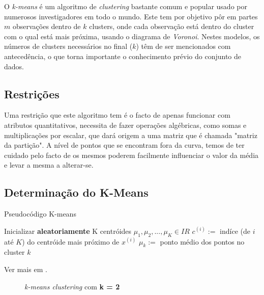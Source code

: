 \documentclass[12pt, a4paper, oneside]{scrreport}
\begin{document}
\quad O \textit{k-means} é um algoritmo de \textit{clustering} bastante comum e popular usado por numerosos investigadores em todo o mundo. Este tem por objetivo pôr em partes $m$ observações dentro de $k$ clusters, onde cada observação está dentro do cluster com o qual está mais próxima, usando o diagrama de \textit{Voronoi}.
Nestes modelos, os números de clusters necessários no final ($k$) têm de ser mencionados com antecedência, o que torna importante o conhecimento prévio do conjunto de dados. \cite{kmeans}
\vspace{-0.5cm}
\subsection{Restrições}
\quad Uma restrição que este algoritmo tem é o facto de apenas funcionar com atributos quantitativos, necessita de fazer operações algébricas, como somas e multiplicações por escalar, que dará origem a uma matriz que é chamada "matriz da partição". A nível de pontos que se encontram fora da curva, temos de ter cuidado pelo facto de os mesmos poderem facilmente influenciar o valor da média e levar a mesma a alterar-se.
\subsection{Determinação do K-Means}

\begin{algorithm}
\caption{Pseudocódigo K-means}\label{kmeans}
\begin{algorithmic}
\State Inicializar \textbf{aleatoriamente} K centróides $\mu_1, \mu_2, ..., \mu_K \in I\!R$
\Repeat
	 \color{uminho}
	\State$c^{(i)} := $ indíce (de $i$ até $K$) do centróide mais próximo de $x^{(i)}$ \color{uminho!70!black} 
	\EndFor
	 \color{uminho}
	\State $\mu_k := $ ponto médio dos pontos no cluster $k$
	\EndFor
{}

\EndProcedure
\end{algorithmic}
\end{algorithm}
Ver mais em \cite{coursera1}.

\begin{figure}[h!]
  \begin{center}
  \end{center}
  \caption{\normalfont\textit{k-means clustering} com \textbf{k = 2}}
\end{figure}
\end{document}
